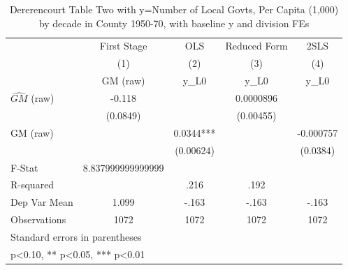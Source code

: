 \begin{table}[htbp]\centering
\def\sym#1{\ifmmode^{#1}\else\(^{#1}\)\fi}
\caption{Dererencourt Table Two with y=Number of Local Govts, Per Capita (1,000) by decade in County 1950-70, with baseline y and division FEs}
\begin{tabular}{l*{4}{c}}
\toprule
                    & First Stage   &         OLS   &Reduced Form   &        2SLS   \\
                    &\multicolumn{1}{c}{(1)}&\multicolumn{1}{c}{(2)}&\multicolumn{1}{c}{(3)}&\multicolumn{1}{c}{(4)}\\
                    &\multicolumn{1}{c}{GM  (raw)}&\multicolumn{1}{c}{y\_L0}&\multicolumn{1}{c}{y\_L0}&\multicolumn{1}{c}{y\_L0}\\
\midrule
$\hat{GM}$ (raw)    &      -0.118   &               &   0.0000896   &               \\
                    &    (0.0849)   &               &   (0.00455)   &               \\
\addlinespace
GM  (raw)           &               &      0.0344***&               &   -0.000757   \\
                    &               &   (0.00624)   &               &    (0.0384)   \\
\midrule
F-Stat              &8.837999999999999   &               &               &               \\
R-squared           &               &        .216   &        .192   &               \\
Dep Var Mean        &       1.099   &       -.163   &       -.163   &       -.163   \\
Observations        &        1072   &        1072   &        1072   &        1072   \\
\bottomrule
\multicolumn{5}{l}{\footnotesize Standard errors in parentheses}\\
\multicolumn{5}{l}{\footnotesize * p<0.10, ** p<0.05, *** p<0.01}\\
\end{tabular}
\end{table}
